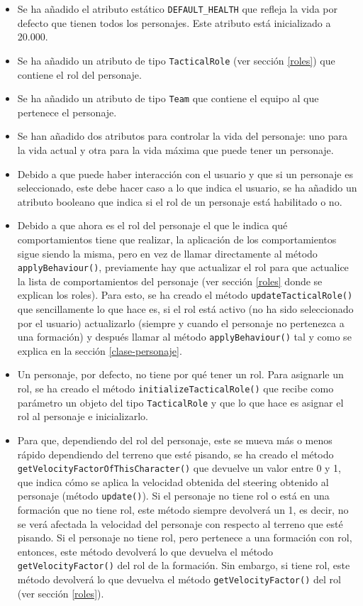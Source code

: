 \begin{itemize}
 \item Se ha añadido el atributo estático \texttt{DEFAULT\_HEALTH} que refleja la vida por defecto que tienen todos los personajes. Este atributo está inicializado a 20.000.
 \item Se ha añadido un atributo de tipo \texttt{TacticalRole} (ver sección \ref{roles}) que contiene el rol del personaje.
 \item Se ha añadido un atributo de tipo \texttt{Team} que contiene el equipo al que pertenece el personaje.
 \item Se han añadido dos atributos para controlar la vida del personaje: uno para la vida actual y otra para la vida máxima que puede tener un personaje.
 \item Debido a que puede haber interacción con el usuario y que si un personaje es seleccionado, este debe hacer caso a lo que indica el usuario, se ha añadido un atributo booleano que indica si el rol de un personaje está habilitado o no.
 \item Debido a que ahora es el rol del personaje el que le indica qué comportamientos tiene que realizar, la aplicación de los comportamientos sigue siendo la misma, pero en vez de llamar directamente al método \texttt{applyBehaviour()}, previamente hay que actualizar el rol para que actualice la lista de comportamientos del personaje (ver sección \ref{roles} donde se explican los roles). Para esto, se ha creado el método \texttt{updateTacticalRole()} que sencillamente lo que hace es, si el rol está activo (no ha sido seleccionado por el usuario) actualizarlo (siempre y cuando el personaje no pertenezca a una formación) y después llamar al método \texttt{applyBehaviour()} tal y como se explica en la sección \ref{clase-personaje}.
 \item Un personaje, por defecto, no tiene por qué tener un rol. Para asignarle un rol, se ha creado el método \texttt{initializeTacticalRole()} que recibe como parámetro un objeto del tipo \texttt{TacticalRole} y que lo que hace es asignar el rol al personaje e inicializarlo.
 \item Para que, dependiendo del rol del personaje, este se mueva más o menos rápido dependiendo del terreno que esté pisando, se ha creado el método \texttt{getVelocityFactorOfThisCharacter()} que devuelve un valor entre 0 y 1, que indica cómo se aplica la velocidad obtenida del steering obtenido al personaje (método \texttt{update()}). Si el personaje no tiene rol o está en una formación que no tiene rol, este método siempre devolverá un 1, es decir, no se verá afectada la velocidad del personaje con respecto al terreno que esté pisando. Si el personaje no tiene rol, pero pertenece a una formación con rol, entonces, este método devolverá lo que devuelva el método \texttt{getVelocityFactor()} del rol de la formación. Sin embargo, si tiene rol, este método devolverá lo que devuelva el método \texttt{getVelocityFactor()} del rol (ver sección \ref{roles}).

\end{itemize}
